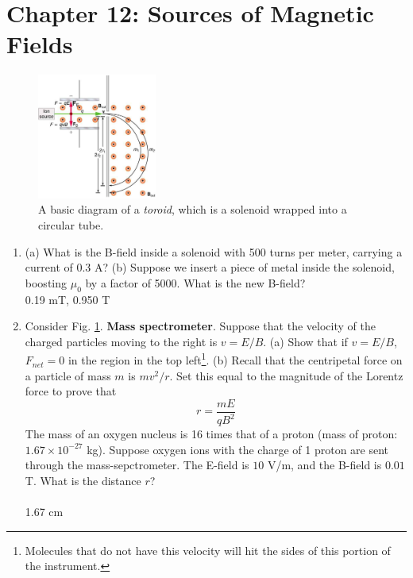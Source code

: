 \documentclass[10pt]{article}
\begin{document}
\section{Chapter 12: Sources of Magnetic Fields}

\begin{figure}[ht]
\centering
\includegraphics[width=0.35\textwidth]{vsel.jpeg}
\caption{\label{fig:chap12_1} A basic diagram of a \textit{toroid}, which is a solenoid wrapped into a circular tube.}
\end{figure}

\begin{enumerate}
\item (a) What is the B-field inside a solenoid with 500 turns per meter, carrying a current of 0.3 A? (b) Suppose we insert a piece of metal inside the solenoid, boosting $\mu_0$ by a factor of 5000.  What is the new B-field?  \\ 

0.19 mT, 0.950 T

\item Consider Fig. \ref{fig:chap12_1}.  \textbf{Mass spectrometer}.  Suppose that the 	velocity of the charged particles moving to the right is $v = E/B$.  (a) Show that if $v = E/B$, $F_{net} = 0$ in the region in the top left\footnote{Molecules that do not have this velocity will hit the sides of this portion of the instrument.}.  (b) Recall that the centripetal force on a particle of mass $m$ is $mv^2/r$.  Set this equal to the magnitude of the Lorentz force to prove that 
\begin{equation}
r = \frac{m E}{q B^2}
\end{equation}
The mass of an oxygen nucleus is 16 times that of a proton (mass of proton: $1.67 \times 10^{-27}$ kg).  Suppose oxygen ions with the charge of 1 proton are sent through the mass-sepctrometer.  The E-field is $10$ V/m, and the B-field is $0.01$ T.  What is the distance $r$?
\\ \\
1.67 cm
\end{enumerate}
\end{document}

